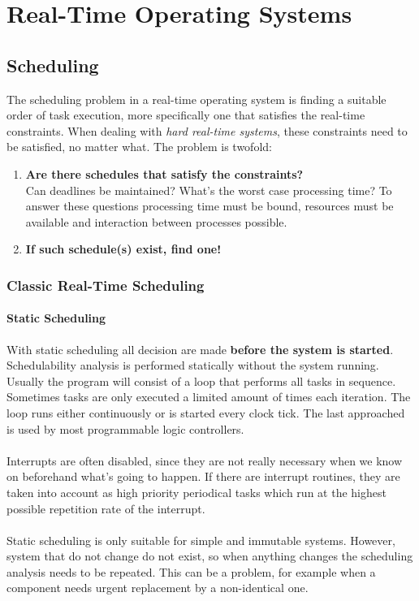 \documentclass[../main.tex]{subfiles}
\begin{document}
\chapter{Real-Time Operating Systems}

\section{Scheduling}
The scheduling problem in a real-time operating system is finding a suitable order of task  execution, more specifically one that satisfies the real-time constraints. When dealing with \textit{hard real-time systems}, these constraints need to be satisfied, no matter what. The problem is twofold:

\begin{enumerate}
	\item \textbf{Are there schedules that satisfy the constraints?} \\
	Can deadlines be maintained? What's the worst case processing time? To answer these questions processing time must be bound, resources must be available and interaction between processes possible. 
	\item \textbf{If such schedule(s) exist, find one!}
\end{enumerate}

\subsection{Classic Real-Time Scheduling}
\subsubsection{Static Scheduling}
With static scheduling all decision are made \textbf{before the system is started}. Schedulability analysis is performed statically without the system running. Usually the program will consist of a loop that performs all tasks in sequence. Sometimes tasks are only executed a limited amount of times each iteration. The loop runs either continuously or is started every clock tick. The last approached is used by most programmable logic controllers.
\\\\
Interrupts are often disabled, since they are not really necessary when we know on beforehand what's going to happen. If there are interrupt routines, they are taken into account as high priority periodical tasks which run at the highest possible repetition rate of the interrupt.
\\\\
Static scheduling is only suitable for simple and immutable systems. However, system that do not change do not exist, so when anything changes the scheduling analysis needs to be repeated. This can be a problem, for example when a component needs urgent replacement by a non-identical one.
\end{document}
